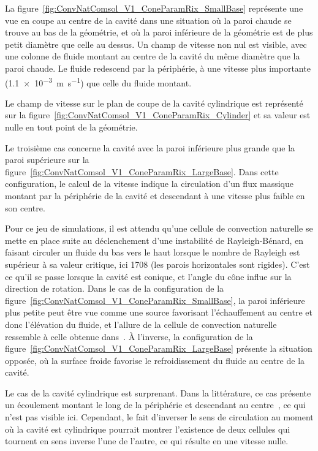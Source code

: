 La figure~\ref{fig:ConvNatComsol_V1_ConeParamRix_SmallBase} représente une vue en coupe au centre de la cavité dans une situation où la paroi chaude se trouve au bas de la géométrie, et où la paroi inférieure de la géométrie est de plus petit diamètre que celle au dessus. Un champ de vitesse non nul est visible, avec une colonne de fluide montant au centre de la cavité du même diamètre que la paroi chaude. Le fluide redescend par la périphérie, à une vitesse plus importante (\qty{1.1e-3}{\meter\per\second}) que celle du fluide montant.\smallskip

Le champ de vitesse sur le plan de coupe de la cavité cylindrique est représenté sur la figure~\ref{fig:ConvNatComsol_V1_ConeParamRix_Cylinder} et sa valeur est nulle en tout point de la géométrie.\smallskip

Le troisième cas concerne la cavité avec la paroi inférieure plus grande que la paroi supérieure sur la figure~\ref{fig:ConvNatComsol_V1_ConeParamRix_LargeBase}. Dans cette configuration, le calcul de la vitesse indique la circulation d'un flux massique montant par la périphérie de la cavité et descendant à une vitesse plus faible en son centre.\medskip

Pour ce jeu de simulations, il est attendu qu'une cellule de convection naturelle se mette en place suite au déclenchement d'une instabilité de Rayleigh-Bénard, en faisant circuler un fluide du bas vers le haut lorsque le nombre de Rayleigh est supérieur à sa valeur critique, ici \num{1708} (les parois horizontales sont rigides). C'est ce qu'il se passe lorsque la cavité est conique, et l'angle du cône influe sur la direction de rotation. Dans le cas de la configuration de la figure~\ref{fig:ConvNatComsol_V1_ConeParamRix_SmallBase}, la paroi inférieure plus petite peut être vue comme une source favorisant l'échauffement au centre et donc l'élévation du fluide, et l'allure de la cellule de convection naturelle ressemble à celle obtenue dans~\cite{basak_heat_2009}. À l'inverse, la configuration de la figure~\ref{fig:ConvNatComsol_V1_ConeParamRix_LargeBase} présente la situation opposée, où la surface froide favorise le refroidissement du fluide au centre de la cavité.\smallskip

Le cas de la cavité cylindrique est surprenant. Dans la littérature, ce cas présente un écoulement montant le long de la périphérie et descendant au centre~\cite{schneider_laminar_1992}, ce qui n'est pas visible ici. Cependant, le fait d'inverser le sens de circulation au moment où la cavité est cylindrique pourrait montrer l'existence de deux cellules qui tournent en sens inverse l'une de l'autre, ce qui résulte en une vitesse nulle.

